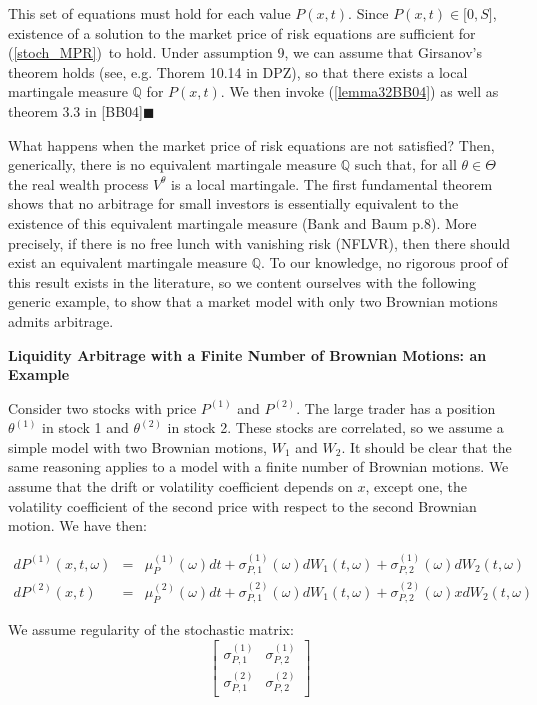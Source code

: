 \documentclass{article}
\begin{document}
This set of equations must hold for each value $P(x,t)$. Since $P(x,t)\in
\lbrack 0,S]$, existence of a solution to the market price of risk equations
are sufficient for (\ref{stoch_MPR})\ to hold. Under assumption 9, we can
assume that Girsanov's theorem holds (see, e.g. Thorem 10.14 in DPZ), so
that there exists a local martingale measure $\mathbb{Q}$ for $P(x,t)$. We
then invoke (\ref{lemma32BB04}) as well as theorem 3.3 in [BB04]$%
\blacksquare $

\bigskip

What happens when the market price of risk equations are not satisfied?
Then, generically, there is no equivalent martingale measure $\mathbb{Q}$
such that, for all $\theta \in \Theta $ the real wealth process $V^{\theta }$
is a local martingale. The first fundamental theorem shows that no arbitrage
for small investors is essentially equivalent to the existence of this
equivalent martingale measure (Bank and Baum p.8). More precisely, if there
is no free lunch with vanishing risk (NFLVR), then there should exist an
equivalent martingale measure $\mathbb{Q}$. To our knowledge, no rigorous
proof of this result exists in the literature, so we content ourselves with
the following generic example, to show that a market model with only two
Brownian motions admits arbitrage.

\bigskip

\textbf{Liquidity Arbitrage with a Finite Number of Brownian Motions: an
Example}

Consider two stocks with price $P^{(1)}$ and $P^{(2)}$. The large trader has
a position $\theta ^{(1)}$ in stock 1 and $\theta ^{(2)}$ in stock 2. These
stocks are correlated, so we assume a simple model with two Brownian
motions, $W_{1}$ and $W_{2}$. It should be clear that the same reasoning
applies to a model with a finite number of Brownian motions. We assume that
the drift or volatility coefficient depends on $x$, except one, the
volatility coefficient of the second price with respect to the second
Brownian motion. We have then:

\begin{eqnarray*}
dP^{(1)}(x,t,\omega ) &=&\mu _{P}^{(1)}(\omega )dt+\sigma
_{P,1}^{(1)}(\omega )dW_{1}(t,\omega )+\sigma _{P,2}^{(1)}(\omega
)dW_{2}(t,\omega ) \\
dP^{(2)}(x,t) &=&\mu _{P}^{(2)}(\omega )dt+\sigma _{P,1}^{(2)}(\omega
)dW_{1}(t,\omega )+\sigma _{P,2}^{(2)}(\omega )xdW_{2}(t,\omega )
\end{eqnarray*}

We assume regularity of the stochastic matrix: 
\begin{equation*}
\left[ 
\begin{array}{cc}
\sigma _{P,1}^{(1)} & \sigma _{P,2}^{(1)} \\ 
\sigma _{P,1}^{(2)} & \sigma _{P,2}^{(2)}%
\end{array}%
\right]
\end{equation*}
\end{document}
